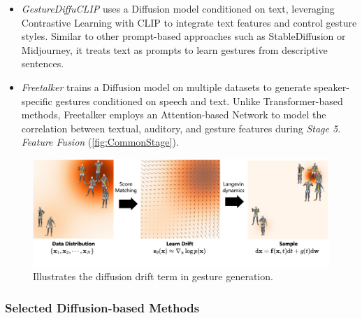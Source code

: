 \begin{itemize}
	\item \textit{GestureDiffuCLIP} \cite{ao2023gesturediffuclip} uses a Diffusion model conditioned on text, leveraging Contrastive Learning with CLIP to integrate text features and control gesture styles. Similar to other prompt-based approaches such as StableDiffusion or Midjourney, it treats text as prompts to learn gestures from descriptive sentences.
	
	\item \textit{Freetalker} \cite{yang2024freetalker} trains a Diffusion model on multiple datasets to generate speaker-specific gestures conditioned on speech and text. Unlike Transformer-based methods, Freetalker employs an Attention-based Network to model the correlation between textual, auditory, and gesture features during \textit{Stage 5. Feature Fusion} (\autoref{fig:CommonStage}).
\end{itemize}

\begin{figure}[htbp]
	\centering
	\includegraphics[width=\linewidth]{figures/ScoreMatching.jpg}
	\caption{Illustrates the diffusion drift term in gesture generation.}
	\label{fig:ScoreMatching}
\end{figure}

\vspace{-0.2cm}
\subsubsection{Selected Diffusion-based Methods}


